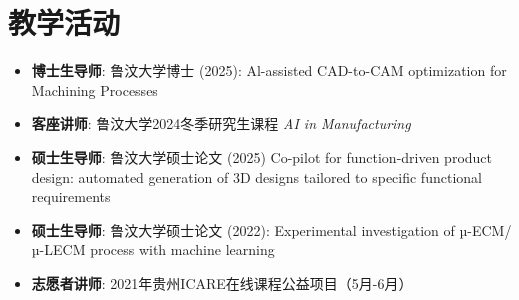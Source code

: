 \documentclass{resume}
\begin{document}
\section{教学活动}
\begin{itemize}[parsep=0.5ex]
  \item \textbf{博士生导师}: 鲁汶大学博士 (2025): Al-assisted CAD-to-CAM optimization for Machining Processes
  \item \textbf{客座讲师}: 鲁汶大学2024冬季研究生课程 \textit{AI in Manufacturing}
  \item \textbf{硕士生导师}: 鲁汶大学硕士论文 (2025) Co-pilot for function-driven product design: automated generation of 3D designs tailored to specific functional requirements
  \item \textbf{硕士生导师}: 鲁汶大学硕士论文 (2022): Experimental investigation of µ-ECM/µ-LECM process with machine learning
        \label{thesis:co-pilot}
  \item \textbf{志愿者讲师}: 2021年贵州ICARE在线课程公益项目（5月-6月）
\end{itemize}

\end{document}
